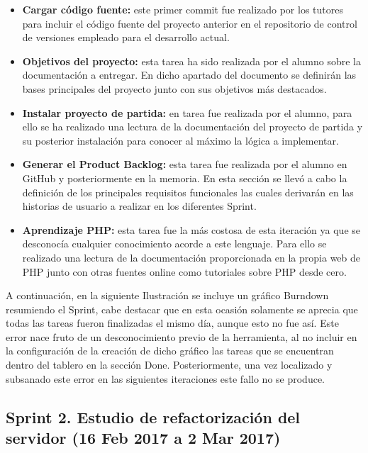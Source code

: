 \begin{itemize}

	\item \textbf{Cargar código fuente:} este primer commit fue realizado por los tutores para incluir el código fuente del proyecto anterior en el repositorio de control de versiones empleado para el desarrollo actual.
	
	\item \textbf{Objetivos del proyecto:} esta tarea ha sido realizada por el alumno sobre la documentación a entregar. En dicho apartado del documento se definirán las bases principales del proyecto junto con sus objetivos más destacados.
	\item \textbf{Instalar proyecto de partida:} en tarea fue realizada por el alumno, para ello se ha realizado una lectura de la documentación del proyecto de partida y su posterior instalación para conocer al máximo la lógica a implementar.
	
	\item \textbf{Generar el Product Backlog:}  esta tarea fue realizada por el alumno en GitHub y posteriormente en la memoria. En esta sección se llevó a cabo la definición de los principales requisitos funcionales las cuales derivarán en las historias de usuario a realizar en los diferentes Sprint.
	
	\item \textbf{Aprendizaje PHP:} esta tarea fue la más costosa de esta iteración ya que se desconocía cualquier conocimiento acorde a este lenguaje. Para ello se realizado una lectura de la documentación proporcionada en la propia web de PHP \cite{wiki:phpdoc} junto con otras fuentes online como tutoriales sobre PHP desde cero.

\end{itemize}


A continuación, en la siguiente Ilustración se incluye un gráfico Burndown resumiendo el Sprint, cabe destacar que en esta ocasión solamente se aprecia que todas las tareas fueron finalizadas el mismo día, aunque esto no fue así. Este error nace fruto de un desconocimiento previo de la herramienta, al no incluir en la configuración de la creación de dicho gráfico las tareas que se encuentran dentro del tablero en la sección Done. Posteriormente, una vez localizado y subsanado este error en las siguientes iteraciones este fallo no se produce.



\subsection{Sprint 2. Estudio de refactorización del servidor (16 Feb 2017 a 2 Mar 2017)}

